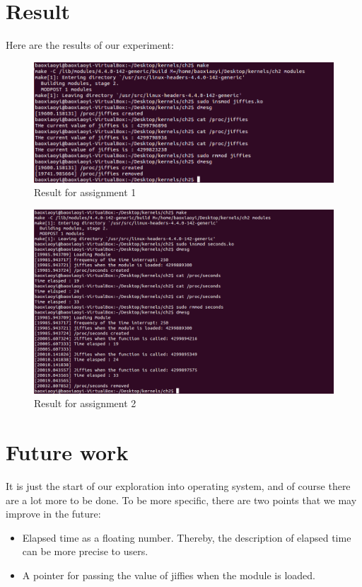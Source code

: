 \documentclass{article}
\begin{document}
\section{Result}
Here are the results of our experiment:
    \begin{figure}[h!]
        \centering
        \includegraphics[scale=0.8]{res1.png}
        \caption{Result for assignment 1}
        \label{fig:fig1}
    \end{figure}
   
 \newpage
 
    \begin{figure}[h!]
        \centering
        \includegraphics[scale=0.8]{res2.png}
        \caption{Result for assignment 2}
        \label{fig:fig2}
    \end{figure}

\section{Future work}
It is just the start of our exploration into operating system, and of course there are a lot more to be done. To be more specific, there are two points that we may improve in the future:
\begin{itemize}
    \item Elapsed time as a floating number. Thereby, the description of elapsed time can be more precise to users.
    \item A pointer for passing the value of jiffies when the module is loaded. 
\end{itemize}
\newpage
\end{document}

